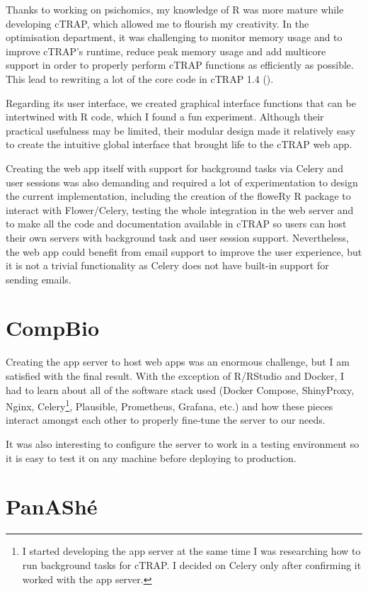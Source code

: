 Thanks to working on psichomics, my knowledge of R was more mature while developing cTRAP, which allowed me to flourish my creativity. In the optimisation department, it was challenging to monitor memory usage and to improve cTRAP's runtime, reduce peak memory usage and add multicore support in order to properly perform cTRAP functions as efficiently as possible. This lead to rewriting a lot of the core code in cTRAP 1.4 ().

Regarding its user interface, we created graphical interface functions that can be intertwined with R code, which I found a fun experiment. Although their practical usefulness may be limited, their modular design made it relatively easy to create the intuitive global interface that brought life to the cTRAP web app.

Creating the web app itself with support for background tasks via Celery and user sessions was also demanding and required a lot of experimentation to design the current implementation, including the creation of the floweRy R package to interact with Flower/Celery, testing the whole integration in the web server and to make all the code and documentation available in cTRAP so users can host their own servers with background task and user session support. Nevertheless, the web app could benefit from email support to improve the user experience, but it is not a trivial functionality as Celery does not have built-in support for sending emails.

\section{CompBio}

Creating the app server to host web apps was an enormous challenge, but I am satisfied with the final result. With the exception of R/RStudio and Docker, I had to learn about all of the software stack used (Docker Compose, ShinyProxy, Nginx, Celery\footnote{I started developing the app server at the same time I was researching how to run background tasks for cTRAP. I decided on Celery only after confirming it worked with the app server.}, Plausible, Prometheus, Grafana, etc.) and how these pieces interact amongst each other to properly fine-tune the server to our needs.

It was also interesting to configure the server to work in a testing environment so it is easy to test it on any machine before deploying to production.

\section{PanAShé}

